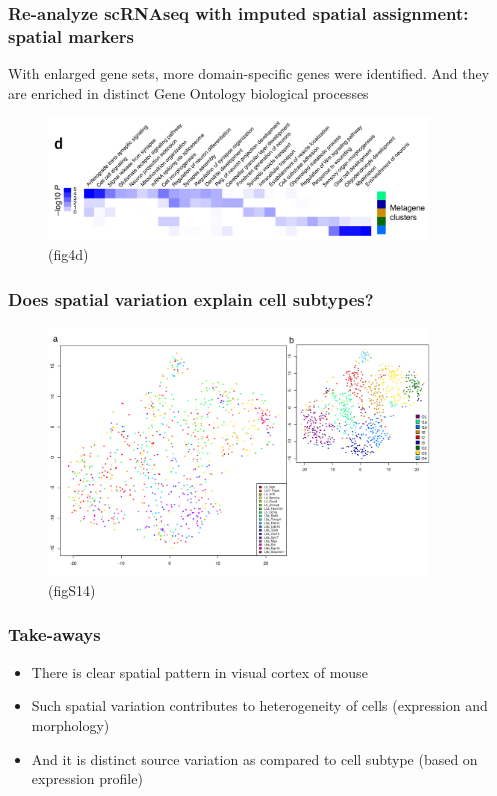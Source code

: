 \documentclass{beamer}
\begin{document}
  \begin{frame}
  \frametitle{Re-analyze scRNAseq with imputed spatial assignment: spatial markers}
  With enlarged gene sets, more domain-specific genes were identified. And they are enriched in distinct Gene Ontology biological processes
  \begin{figure}
    \centering
    \includegraphics[width=0.9\textwidth]{enrich} (fig4d)
  \end{figure}
  \end{frame}

  \begin{frame}
  \frametitle{Does spatial variation explain cell subtypes?}
  \begin{figure}
    \centering
    \includegraphics[width=0.9\textwidth]{subtype} (figS14)
  \end{figure}
  \end{frame}

  \begin{frame}
  \frametitle{Take-aways}
  \begin{itemize}
    \item There is clear spatial pattern in visual cortex of mouse
    \item Such spatial variation contributes to heterogeneity of cells (expression and morphology)
    \item And it is distinct source variation as compared to cell subtype (based on expression profile)
  \end{itemize}
  \end{frame}
\end{document}
